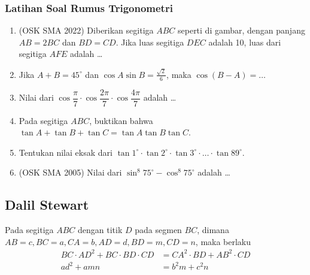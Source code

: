 \documentclass[12pt]{scrartcl}
\begin{document}
    \subsubsection{Latihan Soal Rumus Trigonometri}
    \begin{enumerate}
        \item (OSK SMA 2022) Diberikan segitiga $ABC$ seperti di gambar, dengan panjang $AB = 2BC$ dan $BD = CD$. Jika luas segitiga $DEC$ adalah 10, luas dari segitiga $AFE$ adalah \dots
    
    	\item Jika $A+B=45^\circ$ dan $\cos A\sin B=\frac{\sqrt{2}}{6}$, maka $\cos(B-A)=\dots$
    	
    	\item Nilai dari $\cos \dfrac{\pi}{7}\cdot \cos \dfrac{2\pi}{7} \cdot \cos \dfrac{4\pi}{7}$ adalah \dots
    	
    	\item Pada segitiga $ABC$, buktikan bahwa $\tan A + \tan B + \tan C = \tan A \tan B \tan C$.
    	
    	\item Tentukan nilai eksak dari $\tan 1^\circ \cdot \tan 2^\circ \cdot \tan 3^\circ \cdot \ldots \cdot \tan 89^\circ$.
    	
    	\item (OSK SMA 2005) Nilai dari $\sin^8 75^\circ - \cos^8 75^\circ$ adalah \dots
    \end{enumerate}

\subsection{Dalil Stewart}
    Pada segitiga $ABC$ dengan titik $D$ pada segmen $BC$, dimana $AB=c, BC=a, CA=b, AD=d, BD=m, CD=n$, maka berlaku
    \begin{align*}
        BC \cdot AD^2 + BC \cdot BD \cdot CD &= CA^2 \cdot BD + AB^2 \cdot CD\\
        ad^2+amn &= b^2m+c^2n
    \end{align*}
\begin{center}
\end{center}
\end{document}
